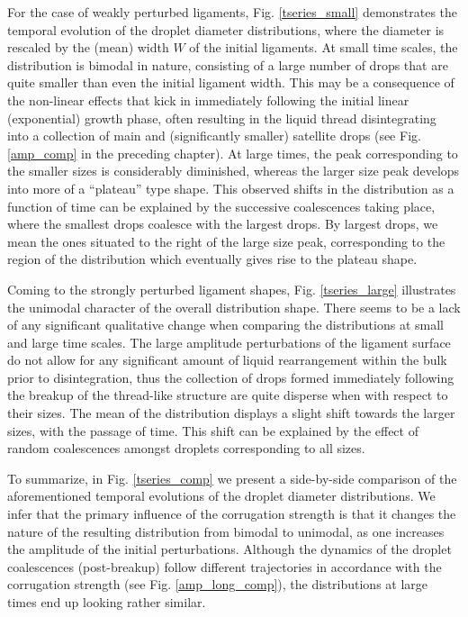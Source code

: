 For the case of weakly perturbed ligaments, Fig. \ref{tseries_small} 
demonstrates the temporal evolution of the droplet diameter distributions, 
where the diameter is rescaled by the (mean) width $W$ of the initial ligaments. 
At small time scales, the distribution is bimodal in nature, consisting of a large
number of drops that are quite smaller than even the initial ligament width. 
This may be a consequence of the non-linear effects \cite{sat_1, sat_2} 
that kick in immediately following the initial linear (exponential) growth phase, 
often resulting in the liquid thread disintegrating into a collection of main 
and (significantly smaller) satellite drops (see Fig. \ref{amp_comp} in the preceding chapter). 
At large times, the peak corresponding to the smaller sizes is considerably diminished, 
whereas the larger size peak develops into more of a ``plateau'' type shape.  
This observed shifts in the distribution as a function of time can be explained by the 
successive coalescences taking place, where the smallest drops coalesce with the largest drops.
By largest drops, we mean the ones situated to the right of the large size peak, 
corresponding to the region of the distribution which eventually gives rise to the plateau shape.


Coming to the strongly perturbed ligament shapes, Fig. \ref{tseries_large} illustrates 
the unimodal character of the overall distribution shape.
There seems to be a lack of any significant qualitative change 
when comparing the distributions at small and large time scales. 
The large amplitude perturbations of the ligament surface do not 
allow for any significant amount of liquid rearrangement within the bulk prior 
to disintegration, thus the collection of drops formed immediately following the breakup
of the thread-like structure are quite disperse when with respect to their sizes.
The mean of the distribution displays a slight shift towards the larger sizes, with the passage of time. 
This shift can be explained by the effect of random coalescences amongst droplets corresponding to all sizes.

To summarize, in Fig. \ref{tseries_comp} we present a side-by-side comparison of 
the aforementioned temporal evolutions of the droplet diameter distributions.  
We infer that the primary influence of the corrugation strength 
is that it changes the nature of the resulting distribution from bimodal to unimodal,
as one increases the amplitude of the initial perturbations. 
Although the dynamics of the droplet coalescences (post-breakup) follow different trajectories
in accordance with the corrugation strength (see Fig. \ref{amp_long_comp}), 
the distributions at large times end up looking rather similar.

